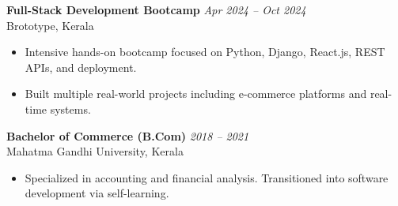 \documentclass[a4paper,9.5pt]{article}
\newcommand{\job}[3]{%
  \noindent\textbf{#1} \hfill \textit{#2}\\%
  \RaggedRight #3\vspace{4pt}%
}
\begin{document}
\job{Full-Stack Development Bootcamp}{Apr 2024 -- Oct 2024}{%
Brototype, Kerala
\begin{itemize}
    \item Intensive hands-on bootcamp focused on Python, Django, React.js, REST APIs, and deployment.
    \item Built multiple real-world projects including e-commerce platforms and real-time systems.
\end{itemize}
}

\job{Bachelor of Commerce (B.Com)}{2018 -- 2021}{%
Mahatma Gandhi University, Kerala
\begin{itemize}
    \item Specialized in accounting and financial analysis. Transitioned into software development via self-learning.
\end{itemize}
}
\end{document}
